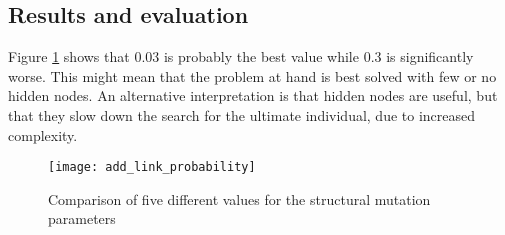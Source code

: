 \subsection{Results and evaluation}
Figure \ref{fig:exp2_add_link_probability} shows that 0.03 is probably the best value while 0.3 is significantly worse. This might mean that the problem at hand is best solved with few or no hidden nodes. An alternative interpretation is that hidden nodes are useful, but that they slow down the search for the ultimate individual, due to increased complexity.

\begin{figure}[h]
    \centering
    \texttt{[image: add\_link\_probability]}
    \caption{Comparison of five different values for the structural mutation parameters}
    \label{fig:exp2_add_link_probability}
\end{figure}

